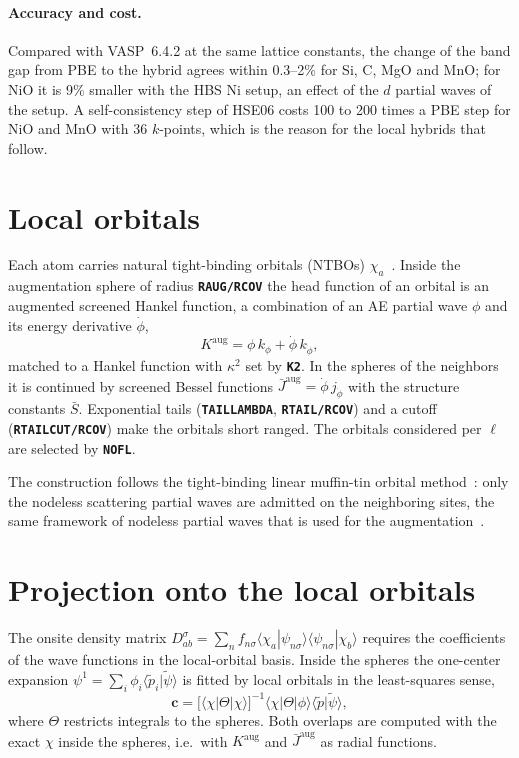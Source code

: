 \documentclass[11pt,a4paper,oneside]{book}
\newcommand{\key}[1]{\textbf{\texttt{#1}}}
\newcommand{\bra}[1]{\langle #1|}
\newcommand{\ket}[1]{|#1\rangle}
\newcommand{\braket}[2]{\langle #1|#2\rangle}
\newcommand{\pt}{\tilde p}
\begin{document}
\paragraph{Accuracy and cost.} Compared with VASP~6.4.2 at the same
lattice constants, the change of the band gap from PBE to the hybrid
agrees within 0.3--2\% for Si, C, MgO and MnO; for NiO it is 9\% smaller
with the HBS Ni setup, an effect of the $d$ partial waves of the setup.
A self-consistency step of HSE06 costs 100 to 200 times a PBE step for
NiO and MnO with 36 $k$-points, which is the reason for the local
hybrids that follow.

\section{Local orbitals}

Each atom carries natural tight-binding orbitals (NTBOs)
$\chi_a$~\cite{andersen84_prl53_2571,bloechl11_prb84_205101}. Inside the
augmentation sphere of radius \key{RAUG/RCOV} the head function of an
orbital is an augmented screened Hankel function, a combination of an AE
partial wave $\phi$ and its energy derivative $\dot\phi$,
\begin{equation}
  K^{\mathrm{aug}} = \phi\,k_\phi+\dot\phi\,k_{\dot\phi},
\end{equation}
matched to a Hankel function with $\kappa^2$ set by \key{K2}. In the
spheres of the neighbors it is continued by screened Bessel functions
$\bar J^{\mathrm{aug}}=\dot\phi\,j_{\dot\phi}$ with the structure constants
$\bar S$. Exponential tails (\key{TAILLAMBDA}, \key{RTAIL/RCOV}) and a
cutoff (\key{RTAILCUT/RCOV}) make the orbitals short ranged. The
orbitals considered per $\ell$ are selected by \key{NOFL}.

The construction follows the tight-binding linear muffin-tin orbital
method~\cite{anderson75_prb12_3060,andersen84_prl53_2571}: only the
nodeless scattering partial waves are admitted on the neighboring
sites, the same framework of nodeless partial waves that is used for
the augmentation~\cite{bloechl12_arxiv1210_5937}.

\section{Projection onto the local orbitals}\label{sec:projection}

The onsite density matrix
$D^\sigma_{ab}=\sum_n f_{n\sigma}\braket{\chi_a}{\psi_{n\sigma}}\braket{\psi_{n\sigma}}{\chi_b}$
requires the coefficients of the wave functions in the local-orbital
basis. Inside the spheres the one-center expansion
$\psi^1=\sum_i\phi_i\braket{\pt_i}{\tilde\psi}$ is fitted by local
orbitals in the least-squares sense,
\begin{equation}
  \bm c = \bigl[\bra{\chi}\Theta\ket{\chi}\bigr]^{-1}
          \bra{\chi}\Theta\ket{\phi}\braket{\pt}{\tilde\psi},
\end{equation}
where $\Theta$ restricts integrals to the spheres. Both overlaps are
computed with the exact $\chi$ inside the spheres, i.e.\ with
$K^{\mathrm{aug}}$ and $\bar J^{\mathrm{aug}}$ as radial functions.
\end{document}
